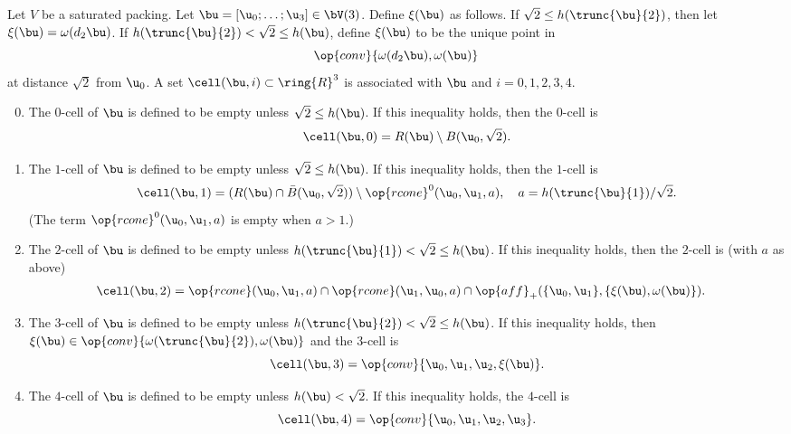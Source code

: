 \begin{definition} 
  Let $V$ be a saturated packing.  Let $\bu=[\u_0;\ldots;\u_3]\in
  \bV(3)$.  Define $\xi(\bu)$ as follows.  If $\sqrt2\le
  h(\trunc{\bu}{2})$, then let $\xi(\bu)=\omega(d_2\bu)$.  If
  $h(\trunc{\bu}{2})<\sqrt2\le h(\bu)$, define $\xi(\bu)$
  to be the unique point in
\[
\op{conv}\{\omega(d_2\bu),\omega(\bu)\}
\]
at distance $\sqrt2$ from $\u_0$.  
A set $\cell(\bu,i)\subset\ring{R}^3$ is associated with $\bu$ and
$i=0,1,2,3,4$.  \hfill\break\smallskip
\begin{enumerate}
\setcounter{enumi}{-1}
\item %
The $0$-cell of $\bu$ is defined to be empty unless $\sqrt2 \le h(\bu)$.
If this inequality holds, then the $0$-cell is
\[  
\cell(\bu,0) = R(\bu)\setminus B(\u_0,\sqrt2).%
\] 
\bigskip
\item The $1$-cell of $\bu$ is defined to be empty unless $\sqrt2 \le
  h(\bu)$.  If this inequality holds, then the $1$-cell is
\[  
\cell(\bu,1) = (R(\bu) \cap  \bar B(\u_0,\sqrt2))
\setminus \op{rcone}^0(\u_0,\u_1,a),
\quad a={h(\trunc{\bu}{1})}/{\sqrt2}.
\] 
(The term $\op{rcone}^0(\u_0,\u_1,a)$ is empty when $a>1$.)
\bigskip
\item The $2$-cell of $\bu$ is defined to be empty unless
  $h(\trunc{\bu}{1})<\sqrt2\le h(\bu)$.  If this inequality holds,
  then the $2$-cell is (with $a$ as above)
\begin{align*} 
\cell(\bu,2) &= 
 \op{rcone}(\u_0,\u_1,a)\cap \op{rcone}(\u_1,\u_0,a)\cap 
\op{aff}_+(\{\u_0,\u_1\},\{\xi(\bu),\omega(\bu)\}).
\end{align*}
\bigskip
\item
The $3$-cell of $\bu$ is defined to be empty unless 
$h(\trunc{\bu}{2}) <\sqrt2 \le h(\bu)$.
If this inequality holds, then $\xi(\bu)\in \op{conv}
\{\omega(\trunc{\bu}{2}),\omega(\bu)\}$
and  the $3$-cell is
\[  
\cell(\bu,3) = \op{conv}\{ \u_0, \u_1, \u_2,\xi(\bu)\}.
\] 
\bigskip
\item
The $4$-cell of $\bu$ is defined to be empty unless
$h(\bu) <\sqrt2$.
If this inequality holds, the $4$-cell is
\[  
\cell(\bu,4) = \op{conv}\{ \u_0, \u_1, \u_2, \u_3\}.
\] 
\end{enumerate}
\end{definition}
